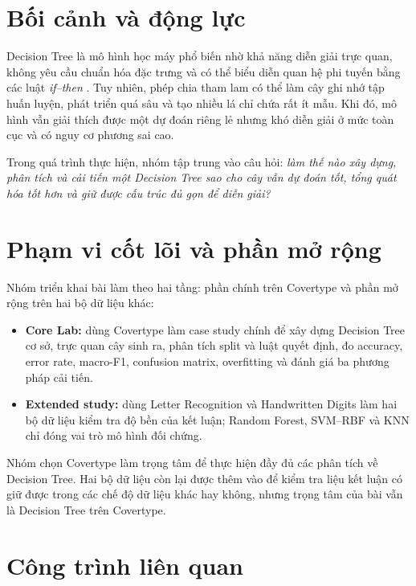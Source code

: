 
\section{Bối cảnh và động lực}

Decision Tree là mô hình học máy phổ biến nhờ khả năng diễn giải trực quan, không yêu cầu chuẩn hóa đặc trưng và có thể biểu diễn quan hệ phi tuyến bằng các luật \textit{if--then} \cite{breiman1984cart}. Tuy nhiên, phép chia tham lam có thể làm cây ghi nhớ tập huấn luyện, phát triển quá sâu và tạo nhiều lá chỉ chứa rất ít mẫu. Khi đó, mô hình vẫn giải thích được một dự đoán riêng lẻ nhưng khó diễn giải ở mức toàn cục và có nguy cơ phương sai cao.

Trong quá trình thực hiện, nhóm tập trung vào câu hỏi: \textit{làm thế nào xây dựng, phân tích và cải tiến một Decision Tree sao cho cây vẫn dự đoán tốt, tổng quát hóa tốt hơn và giữ được cấu trúc đủ gọn để diễn giải?}

\section{Phạm vi cốt lõi và phần mở rộng}

Nhóm triển khai bài làm theo hai tầng: phần chính trên Covertype và phần mở rộng trên hai bộ dữ liệu khác:

\begin{itemize}
    \item \textbf{Core Lab:} dùng Covertype làm case study chính để xây dựng Decision Tree cơ sở, trực quan cây sinh ra, phân tích split và luật quyết định, đo accuracy, error rate, macro-F1, confusion matrix, overfitting và đánh giá ba phương pháp cải tiến.
    \item \textbf{Extended study:} dùng Letter Recognition và Handwritten Digits làm hai bộ dữ liệu kiểm tra độ bền của kết luận; Random Forest, SVM--RBF và KNN chỉ đóng vai trò mô hình đối chứng.
\end{itemize}

Nhóm chọn Covertype làm trọng tâm để thực hiện đầy đủ các phân tích về Decision Tree. Hai bộ dữ liệu còn lại được thêm vào để kiểm tra liệu kết luận có giữ được trong các chế độ dữ liệu khác hay không, nhưng trọng tâm của bài vẫn là Decision Tree trên Covertype.

\section{Công trình liên quan}

